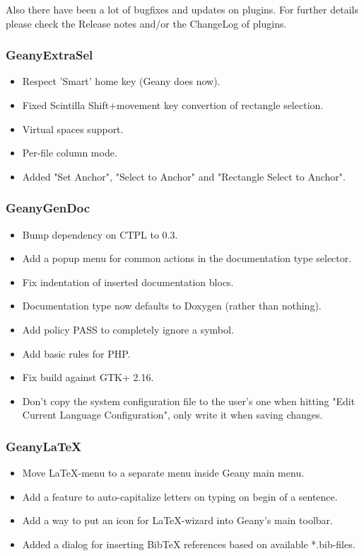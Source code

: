 \documentclass[%
paper=a4,%
fontsize=11pt,%
twoside=false,%
DIV18,
headsepline,
plainheadsepline,
footsepline,
plainfootsepline,
parskip=half,%
openany,%
]{scrartcl}
\begin{document}
Also there have been a lot of bugfixes and updates on plugins. For
further details please check the Release notes and/or the ChangeLog
of plugins.

\subsubsection{GeanyExtraSel}
\begin{itemize}
	\item Respect 'Smart' home key (Geany does now).
	\item Fixed Scintilla Shift+movement key convertion of rectangle selection.
	\item Virtual spaces support.
	\item Per-file column mode.
	\item Added "Set Anchor", "Select to Anchor" and "Rectangle Select to Anchor".
\end{itemize}
\subsubsection{GeanyGenDoc}
\begin{itemize}
	\item Bump dependency on CTPL to 0.3.
	\item Add a popup menu for common actions in the documentation type selector.
	\item Fix indentation of inserted documentation blocs.
	\item Documentation type now defaults to Doxygen (rather than nothing).
	\item Add policy PASS to completely ignore a symbol.
	\item Add basic rules for PHP.
	\item Fix build against GTK+ 2.16.
	\item Don't copy the system configuration file to the user's one when hitting
      "Edit Current Language Configuration", only write it when saving changes.
\end{itemize}

\subsubsection{GeanyLaTeX}
\begin{itemize}
	\item Move LaTeX-menu to a separate menu inside Geany main menu.
	\item Add a feature to auto-capitalize letters on typing on begin of a sentence.
	\item Add a way to put an icon for LaTeX-wizard into Geany's main toolbar.
	\item Added a dialog for inserting BibTeX references based on available *.bib-files.
\end{itemize}
\end{document}
